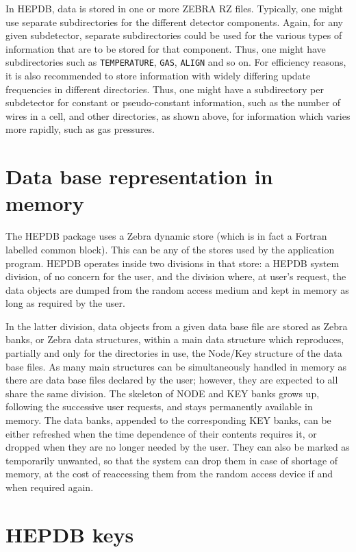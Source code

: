 In HEPDB, data is stored in one or more ZEBRA RZ files.
Typically, one might use separate subdirectories for the different
detector components. Again, for any given subdetector, separate
subdirectories could be used for the various types of information
that are to be stored for that component. Thus, one might have
subdirectories such as {\tt TEMPERATURE}, {\tt GAS}, {\tt ALIGN}
and so on. For efficiency reasons, it is also recommended to
store information with widely differing update frequencies
in different directories. Thus, one might have a subdirectory
per subdetector for constant or pseudo-constant information,
such as the number of wires
in a cell, and other directories, as shown above, for
information which varies more rapidly, such as gas pressures.

\section{Data base representation in memory}

The HEPDB package uses a Zebra dynamic store (which is
in fact a Fortran labelled common block).
This can be any of the stores used by the application program. HEPDB
operates inside two divisions in that store: a HEPDB system division, of
no concern for the user, and the division where, at user's request, the
data objects are dumped from the random access medium and kept in memory
as long as required by the user.

In the latter division, data objects from a given data base file are
stored as Zebra banks, or Zebra data structures, within a main data
structure which reproduces, partially and only for the directories in
use, the Node/Key structure of the data base files. As many main
structures can be simultaneously handled in memory as there are data
base files declared by the user; however, they are expected to all share
the same division. The skeleton of NODE and KEY banks grows up,
following the successive user requests, and stays permanently available
in memory. The data banks, appended to the corresponding KEY
banks, can be either refreshed when the time dependence of their
contents requires it, or dropped when they are no longer needed by the
user. They can also be marked as temporarily unwanted, so that the
system can drop them in case of shortage of memory, at the cost of
reaccessing them from the random access device if and when required
again.

\section{HEPDB keys}

